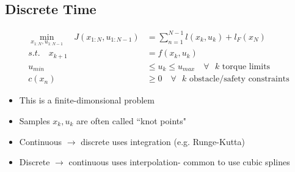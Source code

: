 \documentclass[11pt]{article}
\begin{document}
\subsection{Discrete Time}
\begin{align*}
    \min_{x_{1:N},u_{1:N-1}} \quad J(x_{1:N}, u_{1:N-1}) &= \sum_{n=1}^{N-1} l(x_k,u_k) + l_F(x_N)
    \\
    s.t. \quad x_{k+1} &= f(x_k,u_k)
    \\
    u_{min}&\leq u_k \leq u_{max} \quad \forall \text{ }k\text{ torque limits}
    \\
    c(x_n) &\geq 0 \quad \forall \text{ } k \text{ obstacle/safety constraints}
\end{align*}
\begin{itemize}
    \item This is a finite-dimonsional problem
    \item Samples $x_k,u_k$ are often called ``knot points"
    \item Continuous $\rightarrow$ discrete uses integration (e.g. Runge-Kutta)
    \item Discrete $\rightarrow$ continuous uses interpolation- common to use cubic splines
\end{itemize}
\end{document}
